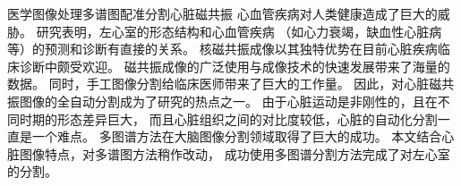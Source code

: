 
\begin{Cabstract}{医学图像处理}{多谱图}{配准}{分割}{心脏磁共振}
  心血管疾病对人类健康造成了巨大的威胁。
  研究表明，左心室的形态结构和心血管疾病
  （如心力衰竭，缺血性心脏病等）的预测和诊断有直接的关系。
  核磁共振成像以其独特优势在目前心脏疾病临床诊断中颇受欢迎。
  磁共振成像的广泛使用与成像技术的快速发展带来了海量的数据。
  同时，手工图像分割给临床医师带来了巨大的工作量。
  因此，对心脏磁共振图像的全自动分割成为了研究的热点之一。
  由于心脏运动是非刚性的，且在不同时期的形态差异巨大，
  而且心脏组织之间的对比度较低，心脏的自动化分割一直是一个难点。
  多图谱方法在大脑图像分割领域取得了巨大的成功。
  本文结合心脏图像特点，对多谱图方法稍作改动，
  成功使用多图谱分割方法完成了对左心室的分割。
\end{Cabstract}

